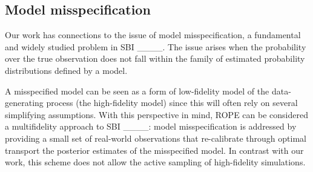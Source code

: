 








\subsection{Model misspecification} 

Our work has connections to the issue of model misspecification, a fundamental and widely studied problem in SBI ____. The issue arises when the probability over the true observation does not fall within the family of estimated probability distributions defined by a model.

A misspecified model can be seen as a form of low-fidelity model of the data-generating process (the high-fidelity model) since this will often rely on several simplifying assumptions.
With this perspective in mind, ROPE can be considered a multifidelity approach to SBI ____: model misspecification is addressed by providing a small set of real-world observations that re-calibrate through optimal transport the posterior estimates of the misspecified model. In contrast with our work, this scheme does not allow the active sampling of high-fidelity simulations. 

